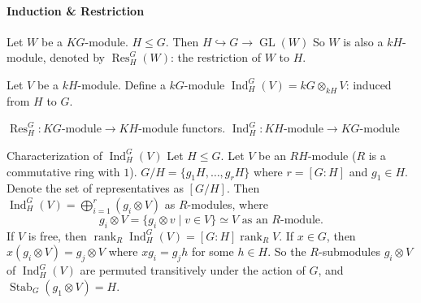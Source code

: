 \documentclass[11pt, a4paper]{report}
\begin{document}
\paragraph{Induction \& Restriction}

\begin{definition}[Restriction]

Let $W$ be a $KG$-module. $H \leq G$. Then $H \hookrightarrow G \rightarrow \operatorname{GL}(W)$
So $W$ is also a $kH$-module, denoted by $\operatorname{Res}_{H}^{G}(W)$: the restriction of $W$ to $H$.

\end{definition}

\begin{definition}[Induction]

Let $V$ be a $kH$-module.
Define a $kG$-module $\operatorname{Ind}_{H}^{G}(V)=kG \otimes_{kH} V$: induced from $H$ to $G$.

\end{definition}

\begin{remark}
$\operatorname{Res}_{H}^{G}: KG\text{-module} \to KH\text{-module}$ functors.
$\operatorname{Ind}_{H}^{G}: KH\text{-module} \to KG\text{-module}$
\end{remark}

\begin{proposition}
Characterization of $\operatorname{Ind}_{H}^{G}(V)$
Let $H \leq G$. Let $V$ be an $RH$-module ($R$ is a commutative ring with $1$).
$G/H = \{g_{1}H, \dots, g_{r}H\}$ where $r=[G:H]$ and $g_{1} \in H$.
Denote the set of representatives as $[G/H]$.
Then $\operatorname{Ind}_{H}^{G}(V)=\bigoplus_{i=1}^{r}(g_{i} \otimes V)$ as $R$-modules, where
\[
g_{i} \otimes V=\{g_{i} \otimes v \mid v \in V\} \simeq V \text{ as an } R\text{-module.}
\]
If $V$ is free, then $\operatorname{rank}_{R} \operatorname{Ind}_{H}^{G}(V)=[G:H] \operatorname{rank}_{R} V$.
If $x \in G$, then $x(g_{i} \otimes V)=g_{j} \otimes V$ where $x g_{i}=g_{j} h$ for some $h \in H$.
So the $R$-submodules $g_{i} \otimes V$ of $\operatorname{Ind}_{H}^{G}(V)$ are permuted transitively under the action of $G$, and $\operatorname{Stab}_{G}(g_{1} \otimes V)=H$.
\end{proposition}
\end{document}

